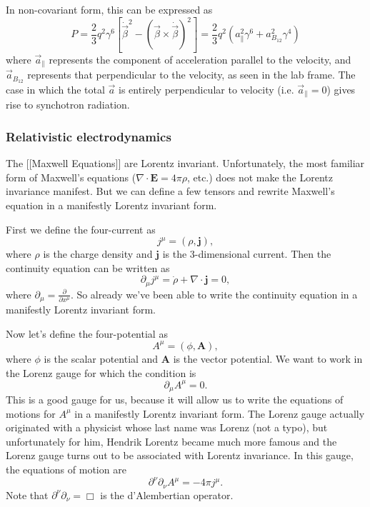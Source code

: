 \documentclass{article}
\def\bot{{B_{12}}}
\def\bot{{B_{12}}}
\def\bot{{B_{12}}}
\begin{document}
In non-covariant form, this can be expressed as
\begin{equation}
P = \frac{2}{3} q^2 \gamma^6 \left[\dot{\vec{\beta}}^2 - \left(\vec{\beta} \times \dot{\vec{\beta}}\right)^2\right] = \frac{2}{3}q^2\left(a_\parallel^2 \gamma^6 + a_\bot^2 \gamma^4\right)
\end{equation}
where $\vec{a}_\parallel$ represents the component of acceleration parallel to the velocity, and $\vec{a}_\bot$ represents that perpendicular to the velocity, as seen in the lab frame. The case in which the total $\vec{a}$ is entirely perpendicular to velocity (i.e. $\vec{a}_\parallel = 0$) gives rise to synchotron radiation.

\subsubsection*{Relativistic electrodynamics}

The [[Maxwell Equations]] are Lorentz invariant. Unfortunately, the most familiar form of Maxwell's equations ($\nabla \cdot \mathbf{E} = 4 \pi \rho$, etc.) does not make the Lorentz invariance manifest. But we can define a few tensors and rewrite Maxwell's equation in a manifestly Lorentz invariant form.

First we define the four-current as \begin{equation} j^\mu = (\rho , \mathbf{j}) , \end{equation} where $\rho$ is the charge density and $\mathbf{j}$ is the 3-dimensional current. Then the continuity equation can be written as \begin{equation} \partial_\mu j^\mu = \dot{\rho} + \nabla \cdot \mathbf{j} = 0 , \end{equation} where $\partial_\mu = \frac{\partial}{\partial x^\mu}$. So already we've been able to write the continuity equation in a manifestly Lorentz invariant form.

Now let's define the four-potential as \begin{equation} A^\mu = (\phi, \mathbf{A}) , \end{equation} where $\phi$ is the scalar potential and $\mathbf{A}$ is the vector potential. We want to work in the Lorenz gauge for which the condition is \begin{equation} \partial_\mu A^\mu = 0 . \end{equation} This is a good gauge for us, because it will allow us to write the equations of motions for $A^\mu$ in a manifestly Lorentz invariant form. The Lorenz gauge actually originated with a physicist whose last name was Lorenz (not a typo), but unfortunately for him, Hendrik Lorentz became much more famous and the Lorenz gauge turns out to be associated with Lorentz invariance. In this gauge, the equations of motion are \begin{equation} \partial^\nu \partial_\nu A^\mu = - 4 \pi j^\mu . \end{equation} Note that $\partial^\nu \partial_\nu = \Box$ is the d'Alembertian operator.
\end{document}
